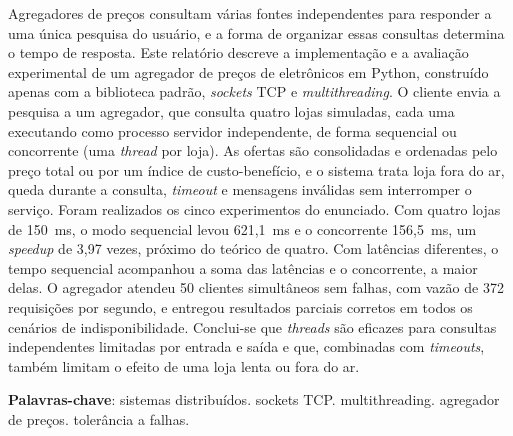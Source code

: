 

\preambulo{\naturezatrabalho}

\newcommand{\fonteexperimentos}{\fonte{Elaborado pelos autores (2026), a partir de \cod{backend/resultados/}.}}


\frenchspacing

\pretextual
\capagrupo
\folhaderostogrupo

\setlength{\absparsep}{18pt}
\begin{resumo}
Agregadores de preços consultam várias fontes independentes para responder a uma única pesquisa do usuário, e a forma de organizar essas consultas determina o tempo de resposta. Este relatório descreve a implementação e a avaliação experimental de um agregador de preços de eletrônicos em Python, construído apenas com a biblioteca padrão, \textit{sockets} TCP e \textit{multithreading}. O cliente envia a pesquisa a um agregador, que consulta quatro lojas simuladas, cada uma executando como processo servidor independente, de forma sequencial ou concorrente (uma \textit{thread} por loja). As ofertas são consolidadas e ordenadas pelo preço total ou por um índice de custo-benefício, e o sistema trata loja fora do ar, queda durante a consulta, \textit{timeout} e mensagens inválidas sem interromper o serviço. Foram realizados os cinco experimentos do enunciado. Com quatro lojas de 150~ms, o modo sequencial levou 621,1~ms e o concorrente 156,5~ms, um \textit{speedup} de 3,97 vezes, próximo do teórico de quatro. Com latências diferentes, o tempo sequencial acompanhou a soma das latências e o concorrente, a maior delas. O agregador atendeu 50 clientes simultâneos sem falhas, com vazão de 372 requisições por segundo, e entregou resultados parciais corretos em todos os cenários de indisponibilidade. Conclui-se que \textit{threads} são eficazes para consultas independentes limitadas por entrada e saída e que, combinadas com \textit{timeouts}, também limitam o efeito de uma loja lenta ou fora do ar.

\textbf{Palavras-chave}: sistemas distribuídos. sockets TCP. multithreading. agregador de preços. tolerância a falhas.
\end{resumo}

